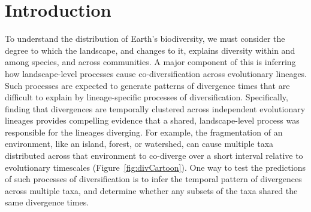 
\section{Introduction}

To understand the distribution of Earth's biodiversity, we must consider the
degree to which the landscape, and changes to it, explains diversity within and
among species, and across communities.
A major component of this is inferring how landscape-level processes cause
co-diversification across evolutionary lineages.
Such processes are expected to generate patterns of divergence times that are
difficult to explain by lineage-specific processes of diversification.
Specifically, finding that divergences are temporally clustered across
independent evolutionary lineages provides compelling evidence that a shared,
landscape-level process was responsible for the lineages diverging.
For example, the fragmentation of an environment, like an island, forest, or
watershed, can cause multiple taxa distributed across that environment to
co-diverge over a short interval relative to evolutionary timescales
(Figure~\ref{fig:divCartoon}).
One way to test the predictions of such processes of diversification is to
infer the temporal pattern of divergences across multiple taxa, and determine
whether any subsets of the taxa shared the same divergence times.

